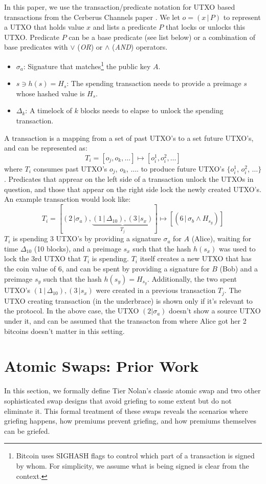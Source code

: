 In this paper, we use the transaction/predicate notation for UTXO based transactions from the Cerberus Channels paper \cite{cerberus}. We let $o = (x\,|\,P)$ to represent a UTXO that holds value $x$ and lists a predicate $P$ that locks or unlocks this UTXO. Predicate $P$ can be a base predicate (see list below) or a combination of base predicates with $\lor$ (\textit{OR}) or $\land$ (\textit{AND}) operators.
\begin{itemize}
    \item $\sigma_a$: Signature that matches\footnote{Bitcoin uses SIGHASH flags to control which part of a transaction is signed by whom. For simplicity, we assume what is being signed is clear from the context.} the public key $A$.
    \item $s \ni h(s) = H_s$: The spending transaction needs to provide a preimage $s$ whose hashed value is $H_s$.
    \item $\Delta_k$: A timelock of $k$ blocks needs to elapse to unlock the spending transaction.
\end{itemize}
A transaction is a mapping from a set of past UTXO's to a set future UTXO's, and can be represented as:
$$T_i = [o_j, o_k, \ldots] \mapsto [o_i^1, o_i^2, \ldots]$$
where $T_i$ consumes past UTXO's $o_j$, $o_k$, $\ldots$. to produce future UTXO's $\{o_i^1$, $o_i^2$, $\ldots\}$. Predicates that apprear on the left side of a transaction unlock the UTXOs in question, and those that appear on the right side lock the newly created UTXO's. An example transaction would look like:
$$T_i = [(2\,|\sigma_a), \underbrace{(1\,|\,\Delta_{10}), (3\,|s_x)}_{T_j}] \mapsto [(6\,|\,\sigma_b \land H_{s_y})]$$
$T_i$ is spending 3 UTXO's by providing a signature $\sigma_a$ for $A$ (Alice), waiting for time $\Delta_{10}$ (10 blocks), and a preimage $s_x$ such that the hash $h(s_x)$ was used to lock the 3rd UTXO that $T_i$ is spending. $T_i$ itself creates a new UTXO that has the coin value of 6, and can be spent by providing a signature for $B$ (Bob) and a preimage $s_y$ such that the hash $h(s_y) = H_{s_y}$. Additionally, the two spent UTXO's $(1\,|\,\Delta_{10}), (3\,|s_x)$ were created in a previous transaction $T_j$. The UTXO creating transaction (in the underbrace) is shown only if it's relevant to the protocol. In the above case, the UTXO $(2|\sigma_a)$ doesn't show a source UTXO under it, and can be assumed that the transacton from where Alice got her 2 bitcoins doesn't matter in this setting. 

\section{Atomic Swaps: Prior Work}
In this section, we formally define Tier Nolan's classic atomic swap \cite{atomic_swap} and two other sophisticated swap designs that avoid griefing to some extent but do not eliminate it. This formal treatment of these swaps reveals the scenarios where griefing happens, how premiums prevent griefing, and how premiums themselves can be griefed.

